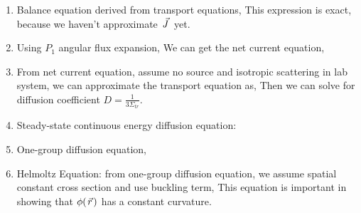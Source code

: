 \documentclass{school-22.211-notes}
\begin{document}
\clearpage
{}
\begin{enumerate}
\item Balance equation derived from transport equations,
This expression is exact, because we haven't approximate $\left.\vec{J}\right.$ yet. 

\item Using $P_1$ angular flux expansion,
  We can get the net current equation,

\item From net current equation, assume no source and isotropic scattering in lab system, we can approximate the transport equation as, 
  Then we can solve for diffusion coefficient $D = \frac{1}{3 \Sigma_{tr}}$. 

\item Steady-state continuous energy diffusion equation:

\item One-group diffusion equation,

\item Helmoltz Equation: from one-group diffusion equation, we assume spatial constant cross section and use buckling term, 
  This equation is important in showing that $\phi(\left.\vec{r}\right.)$ has a constant curvature. 
\end{enumerate}
\end{document}
